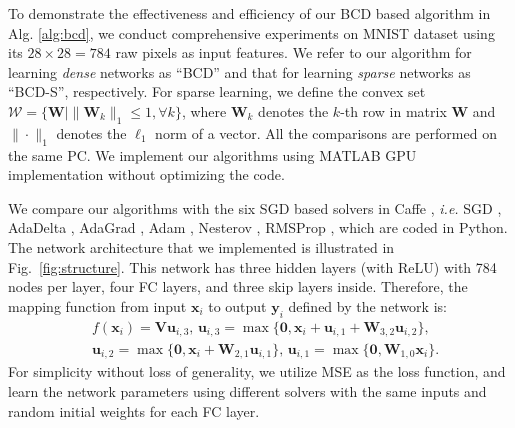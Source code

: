 \documentclass{article}
\def\ie{\emph{i.e. }}
\begin{document}
To demonstrate the effectiveness and efficiency of our BCD based algorithm in Alg. \ref{alg:bcd}, we conduct comprehensive experiments on MNIST \cite{lecun1998mnist} dataset using its $28\times 28 = 784$ raw pixels as input features. We refer to our algorithm for learning {\em dense} networks as ``BCD'' and that for learning {\em sparse} networks as ``BCD-S'', respectively. For sparse learning, we define the convex set $\mathcal{W}=\{\mathbf{W} \mid \|\mathbf{W}_k\|_1\leq 1, \forall k\}$, where $\mathbf{W}_k$ denotes the $k$-th row in matrix $\mathbf{W}$ and $\|\cdot\|_1$ denotes the $\ell_1$ norm of a vector. All the comparisons are performed on the same PC. We implement our algorithms using MATLAB GPU implementation without optimizing the code.




We compare our algorithms with the six SGD based solvers in Caffe \cite{jia2014caffe}, \ie SGD \cite{bottou2012stochastic}, AdaDelta \cite{zeiler2012adadelta}, AdaGrad \cite{duchi2011adaptive}, Adam \cite{kingma2014adam}, Nesterov \cite{sutskever2013importance}, RMSProp \cite{tieleman2012lecture}, which are coded in Python. The network architecture that we implemented is illustrated in Fig.~\ref{fig:structure}. This network has three hidden layers (with ReLU) with 784 nodes per layer, four FC layers, and three skip layers inside. %
Therefore, the mapping function from input $\mathbf{x}_i$ to output $\mathbf{y}_i$ defined by the network is:
\begin{align}
& f(\mathbf{x}_i) = \mathbf{V}\mathbf{u}_{i,3}, \, \mathbf{u}_{i,3} = \max\{\mathbf{0}, \mathbf{x}_i+\mathbf{u}_{i,1}+\mathbf{W}_{3,2}\mathbf{u}_{i,2}\}, \nonumber \\
& \mathbf{u}_{i,2}=\max\{\mathbf{0}, \mathbf{x}_i+\mathbf{W}_{2,1}\mathbf{u}_{i,1}\}, \, \mathbf{u}_{i,1}=\max\{\mathbf{0}, \mathbf{W}_{1,0}\mathbf{x}_i\}. \nonumber
\end{align}
For simplicity without loss of generality, we utilize MSE as the loss function, and learn the network parameters using different solvers with the same inputs and random initial weights for each FC layer. 
\end{document}
